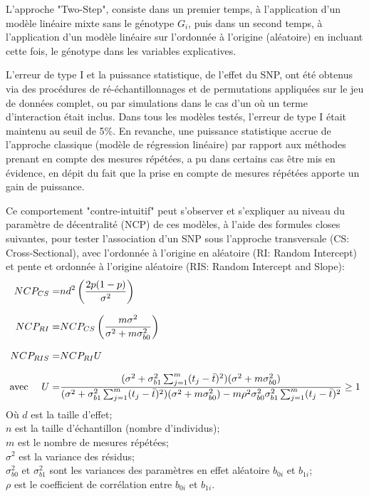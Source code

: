 \documentclass[11pt, a4paper]{article}
\begin{document}
\par{%
L'approche "Two-Step", consiste dans un premier temps, à l'application d'un modèle linéaire mixte sans le génotype $G_i$,
puis dans un second temps, à l'application d'un modèle linéaire sur l'ordonnée à l'origine (aléatoire) en incluant cette fois, le génotype dans les variables explicatives.
}
\par{%
L'erreur de type I et la puissance statistique, de l'effet du SNP, ont été obtenus via des procédures de ré-échantillonnages et de permutations appliquées sur le jeu de données complet,
ou par simulations dans le cas d'un où un terme d'interaction était inclus.
Dans tous les modèles testés, l'erreur de type I était maintenu au seuil de 5\%.
En revanche, une puissance statistique accrue de l'approche classique (modèle de régression linéaire) par rapport aux méthodes prenant en compte des mesures répétées, a pu dans certains cas être mis en évidence,
en dépit du fait que la prise en compte de mesures répétées apporte un gain de puissance.
}
\par{%
Ce comportement "contre-intuitif" peut s'observer et s'expliquer au niveau du paramètre de décentralité (NCP) de ces modèles, à l'aide des formules closes suivantes,
pour tester l'association d'un SNP sous l'approche transversale (CS: Cross-Sectional), avec l’ordonnée à l’origine en aléatoire (RI: Random Intercept) et pente et ordonnée à l'origine aléatoire (RIS: Random Intercept and Slope):
\begin{eqnarray}
    NCP_{CS} =& nd^2\left(\frac{2p(1-p)}{\sigma^2}\right)\\[0.25cm]
    NCP_{RI} =& NCP_{CS}\left(\frac{m\sigma^2}{\sigma^2+m\sigma^2_{b0}}\right)\\[0.25cm]
    NCP_{RIS} =& NCP_{RI}U\label{eq:6}\\[0.25cm]
    \textnormal{avec \hspace{1em}} U =& \frac{%
            (\sigma^2+\sigma^2_{b1}\sum^{m}_{j=1}(t_j-\bar{t})^2)(\sigma^2+m\sigma^2_{b0})%
        }{%
            (\sigma^2+\sigma^2_{b1}\sum^{m}_{j=1}(t_j-\bar{t})^2)(\sigma^2+m\sigma^2_{b0})-m\rho^2\sigma^2_{b0}\sigma^2_{b1}\sum^{m}_{j=1}(t_j-\bar{t})^2
        }\geq 1 \label{eq:7}%
\end{eqnarray}
Où $d$ est la taille d'effet;\\
$n$ est la taille d'échantillon (nombre d'individus);\\
$m$ est le nombre de mesures répétées;\\
$\sigma^2$ est la variance des résidus;\\
$\sigma^2_{b0}$ et $\sigma^2_{b1}$ sont les variances des paramètres en effet aléatoire $b_{0i}$ et $b_{1i}$;\\
$\rho$ est le coefficient de corrélation entre $b_{0i}$ et $b_{1i}$.
}
\end{document}
